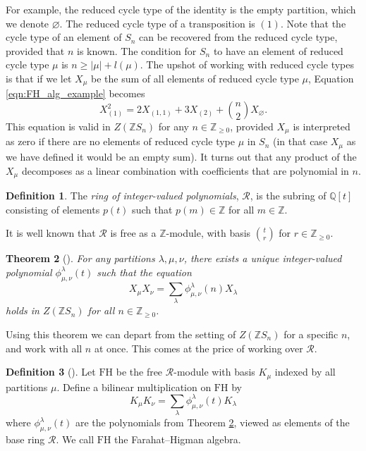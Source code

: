 \documentclass[10pt]{article}
\newtheorem{theorem}{Theorem}[section]
\theoremstyle{definition}
\newtheorem{definition}[theorem]{Definition}
\newcommand{\FH}{\mathrm{FH}}
\begin{document}
For example, the reduced cycle type of the identity is the empty partition, which we denote $\varnothing$. The reduced cycle type of a transposition is $(1)$. Note that the cycle type of an element of $S_n$ can be recovered from the reduced cycle type, provided that $n$ is known. The condition for $S_n$ to have an element of reduced cycle type $\mu$ is $n \geq |\mu| + l(\mu)$. The upshot of working with reduced cycle types is that if we let $X_\mu$ be the sum of all elements of reduced cycle type $\mu$, Equation \eqref{eqn:FH_alg_example} becomes
\begin{equation} \label{precise_FH_alg_example}
X_{(1)}^2 = 2X_{(1,1)} + 3X_{(2)} + \binom{n}{2}X_{\varnothing}.
\end{equation}
This equation is valid in $Z(\mathbb{Z}S_n)$ for any $n \in \mathbb{Z}_{\geq 0}$, provided $X_\mu$ is interpreted as zero if there are no elements of reduced cycle type $\mu$ in $S_n$ (in that case $X_\mu$ as we have defined it would be an empty sum). It turns out that any product of the $X_\mu$ decomposes as a linear combination with coefficients that are polynomial in $n$.

\begin{definition}
The \emph{ring of integer-valued polynomials}, $\mathcal{R}$, is the subring of $\mathbb{Q}[t]$ consisting of elements $p(t)$ such that $p(m) \in \mathbb{Z}$ for all $m \in \mathbb{Z}$.
\end{definition}

It is well known that $\mathcal{R}$ is free as a $\mathbb{Z}$-module, with basis $\binom{t}{r}$ for $r \in \mathbb{Z}_{\geq 0}$.

\begin{theorem}[{\cite[Theorem 2.2]{FarahatHigman}}] \label{thm:FH_alg_polys}
For any partitions $\lambda, \mu, \nu$, there exists a unique integer-valued polynomial $\phi_{\mu, \nu}^\lambda(t)$ such that the equation
\[
X_\mu X_\nu = \sum_\lambda \phi_{\mu, \nu}^\lambda(n)X_\lambda
\]
holds in $Z(\mathbb{Z}S_n)$ for all $n \in \mathbb{Z}_{\geq 0}$.
\end{theorem}

Using this theorem we can depart from the setting of $Z(\mathbb{Z}S_n)$ for a specific $n$, and work with all $n$ at once. This comes at the price of working over $\mathcal{R}$.

\begin{definition}[{\cite[Section 2]{FarahatHigman}}] \label{def:FH_alg}
Let $\FH$ be the free $\mathcal{R}$-module with basis $K_\mu$ indexed by all partitions $\mu$. 
Define a bilinear multiplication on $\FH$ by
\[
K_\mu K_\nu = \sum_{\lambda} \phi_{\mu, \nu}^\lambda(t) K_\lambda
\]
where $\phi_{\mu, \nu}^\lambda(t)$ are the polynomials from Theorem \ref{thm:FH_alg_polys}, viewed as elements of the base ring $\mathcal{R}$. 
We call $\FH$ the Farahat--Higman algebra.
\end{definition}
\end{document}
